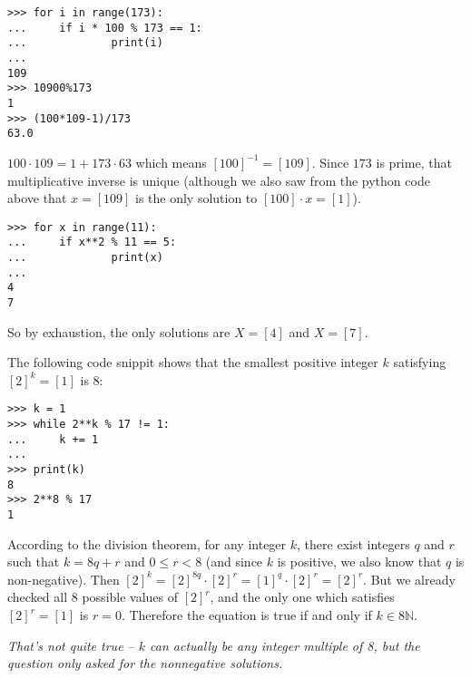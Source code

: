 \documentclass[12pt]{article}
\begin{document}
\bigskip
\noindent{}\bigskip

\begin{verbatim}
>>> for i in range(173):
...     if i * 100 % 173 == 1:
...             print(i)
... 
109
>>> 10900%173
1
>>> (100*109-1)/173
63.0
\end{verbatim}
$100 \cdot 109 = 1 + 173 \cdot 63$ which means $[100]^{-1} = [109]$. Since $173$ is prime, that multiplicative inverse is unique (although we also saw from the python code above that $x=[109]$ is the only solution to $[100]\cdot x=[1]$).

\bigskip
\noindent{}\bigskip

\begin{verbatim}
>>> for x in range(11):
...     if x**2 % 11 == 5:
...             print(x)
... 
4
7
\end{verbatim}
So by exhaustion, the only solutions are $X=[4]$ and $X=[7]$.

\bigskip
\noindent{}\bigskip

The following code snippit shows that the smallest positive integer $k$ satisfying $[2]^k = [1]$ is 8:
\begin{verbatim}
>>> k = 1
>>> while 2**k % 17 != 1:
...     k += 1
... 
>>> print(k)
8
>>> 2**8 % 17
1
\end{verbatim}
According to the division theorem, for any integer $k$, there exist integers $q$ and $r$ such that $k=8q+r$ and $0 \leq r < 8$ (and since $k$ is positive, we also know that $q$ is non-negative). Then $[2]^k = [2]^{8q} \cdot [2]^r = [1]^q \cdot [2]^r = [2]^r$. But we already checked all 8 possible values of $[2]^r$, and the only one which satisfies $[2]^r=[1]$ is $r=0$. Therefore the equation is true if and only if $k \in 8 \mathbb{N}$.
\par
\textit{That's not quite true -- $k$ can actually be any integer multiple of 8, but the question only asked for the nonnegative solutions.}

\bigskip
\noindent{}\bigskip
\end{document}
